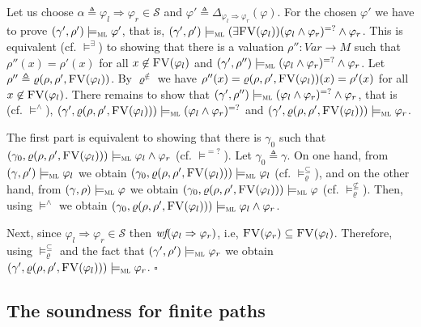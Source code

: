 \documentclass[conference]{IEEEtran}
\newcommand{\M}{\mathit{M}}
\newcommand{\eqbydef}{\triangleq}
\renewcommand{\S}{\mathcal{S}}
\newcommand{\Ra}{\Rightarrow}
\newcommand{\Var}{\mathit{Var}}
\newcommand{\FreeVars}{\mathit{\textsc{FV}}}
\newcommand{\ML}{\textsc{ml}\xspace}
\newcommand{\rrule}[2]{{#1} \Ra{#2}}
\newcommand{\modelsml}{\models_\ML}
\newcommand{\coq}[1]{{\small \textit{#1}}}
\newcommand{\extend}[3]{\varrho({#1},{#2},{#3})}
\begin{document}
Let us choose $\alpha \eqbydef \rrule{\varphi_l}{\varphi_r} \in \S$ and $\varphi' \eqbydef \Delta_{\rrule{\varphi_l}{\varphi_r}} (\varphi)$.
For the chosen $\varphi'$ we have to prove $(\gamma',\rho')\modelsml\varphi'$, that is, $(\gamma',\rho')\modelsml (\exists \FreeVars(\varphi_l)) (\varphi_l \land \varphi_r)^{=?} \land \varphi_r$.
This is equivalent (cf. $\models^\exists$) to showing that there is a valuation $\rho'' : \Var \to \M$ such that $\rho''(x) = \rho'(x)$ for all $x \not\in\FreeVars(\varphi_l)$ and $(\gamma', \rho'')\modelsml(\varphi_l \land \varphi_r)^{=?} \land \varphi_r$.
Let $\rho'' \eqbydef \extend{\rho}{\rho'}{\FreeVars(\varphi_l)}$. 
By $\varrho^{\not\in}$ we have $\rho''(x) = \extend{\rho}{\rho'}{\FreeVars(\varphi_l)}(x) = \rho'(x)$ for all $x\not\in\FreeVars(\varphi_l)$.
There remains to show that $(\gamma', \rho'')\modelsml(\varphi_l \land \varphi_r)^{=?} \land \varphi_r$, that is (cf. $\models^\land$), $(\gamma', \extend{\rho}{\rho'}{\FreeVars(\varphi_l)})\modelsml(\varphi_l \land \varphi_r)^{=?}$ and $(\gamma', \extend{\rho}{\rho'}{\FreeVars(\varphi_l)})\modelsml \varphi_r$.

The first part is equivalent to showing that there is $\gamma_0$ such that $(\gamma_0, \extend{\rho}{\rho'}{\FreeVars(\varphi_l)}) \modelsml \varphi_l \land \varphi_r$ (cf. $\models^{=?}$). 
Let $\gamma_0 \eqbydef \gamma$. On one hand, from $(\gamma, \rho')\modelsml \varphi_l$ we obtain $(\gamma_0, \extend{\rho}{\rho'}{\FreeVars(\varphi_l)}) \modelsml \varphi_l$ (cf. $\models_\varrho^{\subseteq}$), and on the other hand, from $(\gamma, \rho)\modelsml \varphi$ we obtain $(\gamma_0, \extend{\rho}{\rho'}{\FreeVars(\varphi_l)}) \modelsml \varphi$ (cf. $\models_\varrho^{\not\subseteq}$).
Then, using $\models^\land$ we obtain $(\gamma_0, \extend{\rho}{\rho'}{\FreeVars(\varphi_l)}) \modelsml \varphi_l \land \varphi_r$.

Next, since $\rrule{\varphi_l}{\varphi_r} \in \S$ then $\coq{wf}(\rrule{\varphi_l}{\varphi_r})$, i.e, $\FreeVars(\varphi_r) \subseteq \FreeVars(\varphi_l)$.
Therefore, using $\models_\varrho^{\subseteq}$ and the fact that $(\gamma', \rho')\modelsml \varphi_r$ we obtain $(\gamma', \extend{\rho}{\rho'}{\FreeVars(\varphi_l)})\modelsml \varphi_r$. \hfill$\square$\\







\subsection{The soundness for finite paths}
\label{sec:finite}
\end{document}
